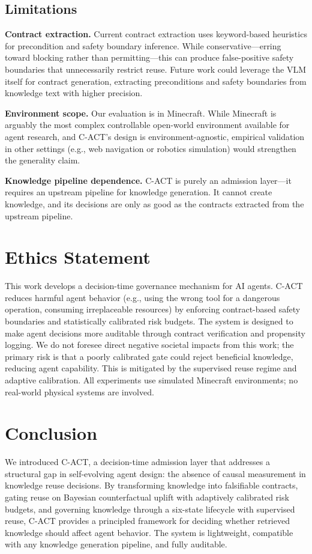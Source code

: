 \documentclass[letterpaper]{article}
\begin{document}
\subsection{Limitations}

\textbf{Contract extraction.} Current contract extraction uses keyword-based heuristics for precondition and safety boundary inference. While conservative---erring toward blocking rather than permitting---this can produce false-positive safety boundaries that unnecessarily restrict reuse. Future work could leverage the VLM itself for contract generation, extracting preconditions and safety boundaries from knowledge text with higher precision.

\textbf{Environment scope.} Our evaluation is in Minecraft. While Minecraft is arguably the most complex controllable open-world environment available for agent research, and \textsc{C-ACT}'s design is environment-agnostic, empirical validation in other settings (e.g., web navigation or robotics simulation) would strengthen the generality claim.

\textbf{Knowledge pipeline dependence.} \textsc{C-ACT} is purely an admission layer---it requires an upstream pipeline for knowledge generation. It cannot create knowledge, and its decisions are only as good as the contracts extracted from the upstream pipeline.

\section{Ethics Statement}

This work develops a decision-time governance mechanism for AI agents. \textsc{C-ACT} reduces harmful agent behavior (e.g., using the wrong tool for a dangerous operation, consuming irreplaceable resources) by enforcing contract-based safety boundaries and statistically calibrated risk budgets. The system is designed to make agent decisions more auditable through contract verification and propensity logging. We do not foresee direct negative societal impacts from this work; the primary risk is that a poorly calibrated gate could reject beneficial knowledge, reducing agent capability. This is mitigated by the supervised reuse regime and adaptive calibration. All experiments use simulated Minecraft environments; no real-world physical systems are involved.

\section{Conclusion}

We introduced \textsc{C-ACT}, a decision-time admission layer that addresses a structural gap in self-evolving agent design: the absence of causal measurement in knowledge reuse decisions. By transforming knowledge into falsifiable contracts, gating reuse on Bayesian counterfactual uplift with adaptively calibrated risk budgets, and governing knowledge through a six-state lifecycle with supervised reuse, \textsc{C-ACT} provides a principled framework for deciding whether retrieved knowledge should affect agent behavior. The system is lightweight, compatible with any knowledge generation pipeline, and fully auditable.


\end{document}
